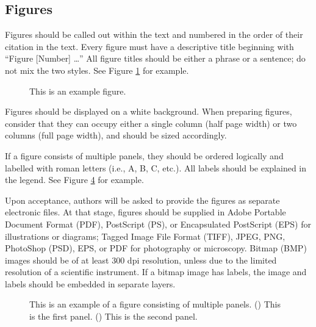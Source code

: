 \documentclass{article}
\begin{document}
\subsection*{Figures}
Figures should be called out within the text and numbered in the order of their citation in the text. Every figure must have a descriptive title beginning with ``Figure [Number] …'' All figure titles should be either a phrase or a sentence; do not mix the two styles. See Figure \ref{fig:1} for example.
\begin{figure}[h]
    \centering
    \caption{This is an example figure.}
    \label{fig:1}
\end{figure}

Figures should be displayed on a white background. When preparing figures, consider that they can occupy either a single column (half page width) or two columns (full page width), and should be sized accordingly.

If a figure consists of multiple panels, they should be ordered logically and labelled with roman letters (i.e., A, B, C, etc.). All labels should be explained in the legend. See Figure \ref{fig:2} for example.

Upon acceptance, authors will be asked to provide the figures as separate electronic files. At that stage, figures should be supplied in Adobe Portable Document Format (PDF), PostScript (PS), or Encapsulated PostScript (EPS) for illustrations or diagrams; Tagged Image File Format (TIFF), JPEG, PNG, PhotoShop (PSD), EPS, or PDF for photography or microscopy. Bitmap (BMP) images should be of at least 300 dpi resolution, unless due to the limited resolution of a scientific instrument. If a bitmap image has labels, the image and labels should be embedded in separate layers.
\begin{figure}[h]
    \centering
    \begin{subfigure}{0.4\textwidth}
        \caption{\label{fig:2a}}
    \end{subfigure}
    \begin{subfigure}{0.4\textwidth}
        \caption{\label{fig:2b}}
    \end{subfigure}
    \caption{This is an example of a figure consisting of multiple panels.     () This is the first panel. () This is the second panel.}
    \label{fig:2}
\end{figure}
\end{document}
